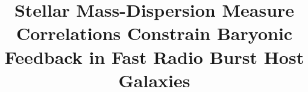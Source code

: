 \documentclass[twocolumn,linenumbers]{aastex631}
\begin{document}
\title{Stellar Mass-Dispersion Measure Correlations Constrain Baryonic Feedback in Fast Radio Burst Host Galaxies}



\end{document}
